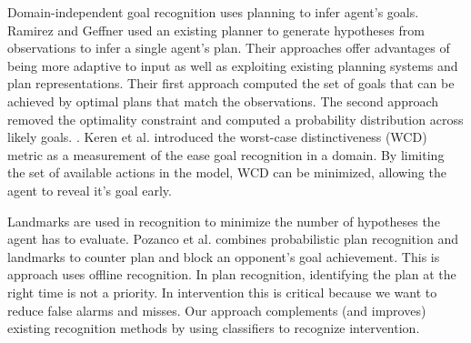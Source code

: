 \documentclass[letterpaper]{article}
\theoremstyle{plain}
\begin{document}
Domain-independent goal recognition uses planning to infer agent’s goals. Ramirez and Geffner  used an existing planner to generate hypotheses from observations to infer a single agent's plan. Their approaches offer advantages of being more adaptive to input as well as exploiting existing planning systems and plan representations. Their first approach computed the set of goals that can be achieved by optimal plans that match the observations. The second approach removed the optimality constraint and computed a probability distribution across likely goals. \cite{ramirez2010probabilistic}. Keren et al.  introduced the worst-case distinctiveness (WCD) metric as a measurement of the ease goal recognition in a domain. By limiting the set of available actions in the model,  WCD can be minimized, allowing the agent to reveal it's goal early.


Landmarks are used in recognition to minimize the number of hypotheses the agent has to evaluate. Pozanco et al.  combines probabilistic plan recognition and landmarks to counter plan and block an opponent's goal achievement. This is approach uses offline recognition. In plan recognition, identifying the plan at the right time is not a priority. In intervention this is critical because we want to reduce false alarms and misses. Our approach complements (and improves) existing recognition methods by using classifiers to recognize intervention.

\end{document}
